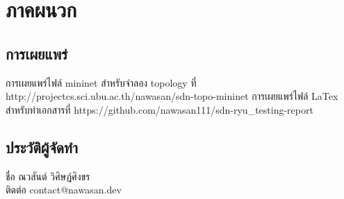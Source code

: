 \section{ภาคผนวก}

\subsection{การเผยแพร่}

การเผยแพร่ไฟล์ mininet สำหรับจำลอง topology ที่ http://projectcs.sci.ubu.ac.th/nawasan/sdn-topo-mininet
การเผยแพร่ไฟล์ LaTex สำหรับทำเอกสารที่ https://github.com/nawasan111/sdn-ryu\_testing-report
\\
\subsection{ประวัติผู้จัดทำ}

ชื่อ ณวสันต์  วิศิษฏ์ศิงขร
\\ 
ติดต่อ contact@nawasan.dev